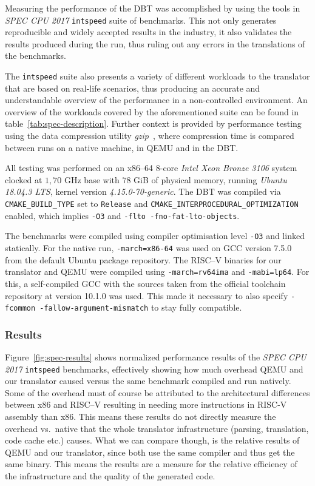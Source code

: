 Measuring the performance of the DBT was accomplished by using the tools in \textit{SPEC CPU 2017} \texttt{intspeed} suite of benchmarks.
This not only generates reproducible and widely accepted results in the industry, it also validates the results produced during the run, thus ruling out any errors in the translations of the benchmarks.

The \texttt{intspeed} suite also presents a variety of different workloads to the translator that are based on real-life scenarios, thus producing an accurate and understandable overview of the performance in a non-controlled environment. %
An overview of the workloads covered by the aforementioned suite can be found in table~\ref{tab:spec-description}.
Further context is provided by performance testing using the data compression utility \textit{gzip}~\cite{gzip}, where compression time is compared between runs on a native machine, in QEMU and in the DBT\@.

All testing was performed on an x86--64 8-core \textit{Intel Xeon Bronze 3106} system clocked at $1,70$ GHz base with $78$ GiB of physical memory, running \textit{Ubuntu 18.04.3 LTS}, kernel version \textit{4.15.0-70-generic}.
The DBT was compiled via \texttt{CMAKE\_BUILD\_TYPE} set to \texttt{Release} and \texttt{CMAKE\_INTERPROCEDURAL\_OPTIMIZATION} enabled, which implies \texttt{-O3} and \texttt{-flto -fno-fat-lto-objects}.

The benchmarks were compiled using compiler optimisation level \texttt{-O3} and linked statically.
For the native run, \texttt{-march=x86-64} was used on GCC version 7.5.0 from the default Ubuntu package repository.
The RISC--V binaries for our translator and QEMU were compiled using \texttt{-march=rv64ima} and \texttt{-mabi=lp64}.
For this, a self-compiled GCC with the sources taken from the official toolchain repository at version 10.1.0 was used.
This made it necessary to also specify \texttt{-fcommon -fallow-argument-mismatch} to stay fully compatible.

\subsubsection{Results}
Figure~\vref{fig:spec-results} shows normalized performance results of the \textit{SPEC CPU 2017} \texttt{intspeed} benchmarks, effectively showing how much overhead QEMU and our translator caused versus the same benchmark compiled and run natively.
Some of the overhead must of course be attributed to the architectural differences between x86 and RISC--V resulting in needing more instructions in RISC-V assembly than x86.
This means these results do not directly measure the overhead vs.\ native that the whole translator infrastructure (parsing, translation, code cache etc.) causes.
What we can compare though, is the relative results of QEMU and our translator, since both use the same compiler and thus get the same binary. %
This means the results are a measure for the relative efficiency of the infrastructure and the quality of the generated code.

